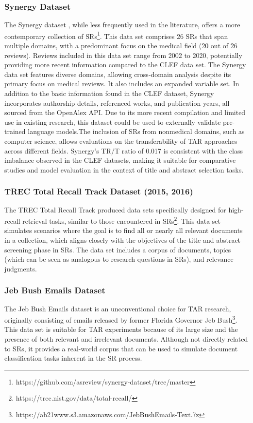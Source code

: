 \documentclass[../main.tex]{subfiles}
\begin{document}
\subsubsection{Synergy Dataset}
The Synergy dataset \cite{de_bruin_synergy_2023}, while less frequently used in the literature, offers a more contemporary collection of SRs\footnote{https://github.com/asreview/synergy-dataset/tree/master}. This data set comprises 26 SRs that span multiple domains, with a predominant focus on the medical field (20 out of 26 reviews). Reviews included in this data set range from 2002 to 2020, potentially providing more recent information compared to the CLEF data set.
The Synergy data set features diverse domains, allowing cross-domain analysis despite its primary focus on medical reviews. It also includes an expanded variable set. In addition to the basic information found in the CLEF dataset, Synergy incorporates authorship details, referenced works, and publication years, all sourced from the OpenAlex API.
Due to its more recent compilation and limited use in existing research, this dataset could be used to externally validate pre-trained language models.The inclusion of SRs from nonmedical domains, such as computer science, allows evaluations on the transferability of TAR approaches across different fields.
Synergy's TR/T ratio of 0.017 is consistent with the class imbalance observed in the CLEF datasets, making it suitable for comparative studies and model evaluation in the context of title and abstract selection tasks.

\subsubsection{TREC Total Recall Track Dataset (2015, 2016)}
The TREC Total Recall Track produced data sets specifically designed for high-recall retrieval tasks, similar to those encountered in SRs\footnote{https://trec.nist.gov/data/total-recall/}\cite{roegiest_trec_2015, grossman_trec_2016}. This data set simulates scenarios where the goal is to find all or nearly all relevant documents in a collection, which aligns closely with the objectives of the title and abstract screening phase in SRs. The data set includes a corpus of documents, topics (which can be seen as analogous to research questions in SRs), and relevance judgments.

\subsubsection{Jeb Bush Emails Dataset}
The Jeb Bush Emails dataset is an unconventional choice for TAR research, originally consisting of emails released by former Florida Governor Jeb Bush\footnote{https://ab21www.s3.amazonaws.com/JebBushEmails-Text.7z}. This data set is suitable for TAR experiments because of its large size and the presence of both relevant and irrelevant documents. Although not directly related to SRs, it provides a real-world corpus that can be used to simulate document classification tasks inherent in the SR process.
\end{document}
